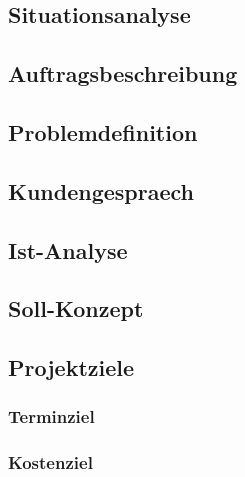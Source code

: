\subsection{Situationsanalyse}
   \blindtext

\subsection{Auftragsbeschreibung}
   \blindtext

\subsection{Problemdefinition}
   \blindtext

\subsection{Kundengespraech}
   \blindtext

\subsection{Ist-Analyse}
   \blindtext

\subsection{Soll-Konzept}
   \blindtext

\subsection{Projektziele}
\subsubsection{Terminziel}
\subsubsection{Kostenziel}

